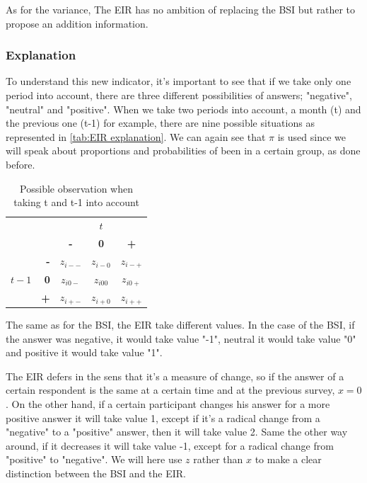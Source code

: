 \documentclass[12pt,a4paper,oneside]{book}
\begin{document}
As for the variance, The EIR has no ambition of replacing the BSI but rather to propose an addition information.

\subsubsection{Explanation}

To understand this new indicator, it's important to see that if we take only one period into account, there are three different possibilities of answers; "negative", "neutral" and "positive". 
When we take two periods into account, a month (t) and the previous one (t-1) for example, there are nine possible situations as represented in \autoref{tab:EIR explanation}. 
We can again see that $\pi$ is used since we will speak about proportions and probabilities of been in a certain group, as done before.

\begin{table}[H]
    \centering
    \begin{tabular}{r | r | c c c | }
    \multicolumn{1}{r}{} & \multicolumn{1}{r}{} &	\multicolumn{3}{c}{$t$} \\ \cline{3-5}
    \multicolumn{1}{r}{} & 		& \textbf{-} & \textbf{0} & \textbf{+} \\ \cline{2-5}
    		&    \textbf{-} & $z_{i--}$	& $z_{i-0}$	& $z_{i-+}$ \\ 
    $t-1$ & \textbf{0} & $z_{i0-}$	& $z_{i00}$	& $z_{i0+}$	\\
    		&    \textbf{+} & $z_{i+-}$	& $z_{i+0}$	& $z_{i++}$ \\ \cline{2-5}
    \end{tabular}
    \caption{Possible observation when taking t and t-1 into account}
    \label{tab:EIR explanation}
\end{table}{}

The same as for the BSI, the EIR take different values. In the case of the BSI, if the answer was negative, it would take value "-1", neutral it would take value "0" and positive it would take value "1".

The EIR defers in the sens that it's a measure of change, so if the answer of a certain respondent is the same at a certain time and at the previous survey, $x=0$. 
On the other hand, if a certain participant changes his answer for a more positive answer it will take value 1, except if it's a radical change from a "negative" to a "positive" answer, then it will take value 2.
Same the other way around, if it decreases it will take value -1, except for a radical change from "positive" to "negative".
We will here use $z$ rather than $x$ to make a clear distinction between the BSI and the EIR.
\end{document}
